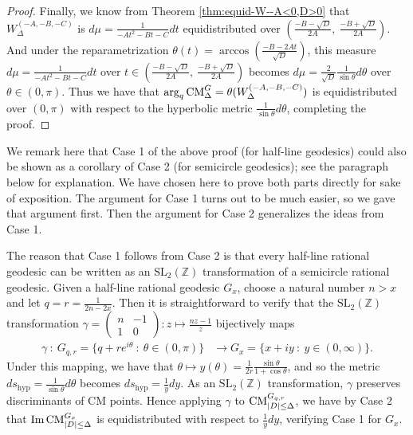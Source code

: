 \documentclass[11pt,letterpaper,reqno]{amsart}
\numberwithin{equation}{section}
\numberwithin{figure}{section}
\numberwithin{table}{section}
\newcommand{\lrp}[1]{\left(#1\right)}
\newcommand{\pttmatrix}[4]{
\left(
\begin{smallmatrix}
  #1 & #2 \\
  #3 & #4
\end{smallmatrix}
\right)
}
\newcommand{\ZZ}{\mathbb{Z}}
\newcommand{\SL}{\text{SL}}
\newcommand{\CM}{\textnormal{CM}}
\begin{document}
\begin{proof}
Finally, we know from Theorem \ref{thm:equid-W--A<0,D>0} that $W_{\Delta}^{(-A,-B,-C)}$ is $d\mu = \frac{1}{-At^2-Bt-C} dt$ equidistributed over $(\frac{-B-\sqrt{D}}{2A},~ \frac{-B+\sqrt{D}}{2A})$. And under the reparametrization 
$\theta(t) = \arccos\lrp{ \frac{ -B - 2A t }{\sqrt D} }$, this measure 
$d\mu = \frac{1}{-At^2-Bt-C} dt$ over $t \in (\frac{-B-\sqrt{D}}{2A},~ \frac{-B+\sqrt{D}}{2A})$ becomes $d\mu = \frac{2}{\sqrt{D}} \frac{1}{\sin \theta} d\theta$ over $\theta \in (0,\pi)$. Thus we have that $\arg_q \CM^{G}_{\Delta} = \theta(W_{\Delta}^{(-A,-B,-C)})$ is equidistributed over $(0,\pi)$ with respect to the hyperbolic metric $\frac{1}{\sin \theta} d\theta$, completing the proof.
\end{proof}




We remark here that Case 1 of the above proof (for half-line geodesics) could also be shown as a corollary of Case 2 (for semicircle geodesics); see the paragraph below for explanation. We have chosen here to prove both parts directly for sake of exposition. The argument for Case 1 turns out to be much easier, so we gave that argument first. Then the argument for Case 2 generalizes the ideas from Case 1. 


The reason that Case 1 follows from Case 2 is that every half-line rational geodesic can be written as an $\SL_2(\ZZ)$ transformation of a semicircle rational geodesic.
Given a half-line rational geodesic $G_x$, choose a natural number $n > x$ and let $q = r = \frac{1}{2n-2x}$.  
Then it is straightforward to verify that the $\SL_2(\ZZ)$ transformation $\gamma = \pttmatrix{n}{-1}{1}{0} : z \mapsto \frac{nz-1}{z} $ bijectively maps 
\begin{align}
    \gamma ~:~ G_{q,r} =\{q + re^{i\theta} ~:~ \theta \in (0,\pi)\} &\longrightarrow 
    G_x =\{x+iy ~:~ y \in (0,\infty)\}.
\end{align}
Under this mapping, we have that $\theta \mapsto y(\theta) =\frac{1}{2r} \frac{\sin \theta}{1+\cos \theta}$, and so the metric $ds_\text{hyp} = \frac{1}{\sin \theta} d\theta$ becomes $ds_\text{hyp} = \frac{1}{y}dy$.
As an $\SL_2(\ZZ)$ transformation, $\gamma$ preserves discriminants of CM points.
Hence applying $\gamma$ to $\CM^{G_{q,r}}_{|D|\le \Delta}$, we have by Case 2 that $\textnormal{Im\,} \CM^{G_x}_{|D|\le \Delta}$ is equidistributed with respect to $\frac{1}{y}dy$, verifying Case 1 for $G_x$.
\end{document}
